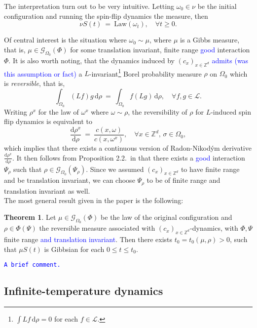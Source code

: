 \documentclass[12pt]{article}
\renewcommand{\d}{\mathrm{d}}
\newcommand{\G}{\mathcal{G}}
\newcommand{\Loc}{\mathcal{L}}
\newcommand{\Z}{\mathbb{Z}}
\newcommand{\Law}{\mathrm{Law}}
\newcommand{\1}{\mathbbm{1}}
\newcommand{\5}{\vspace{0.5cm}}
\theoremstyle{definition}
\newtheorem{thm}{Theorem}[section]
\begin{document}
The interpretation turn out to be very intuitive. Letting $\omega_0\in\nu$ be the initial configuration and running the spin-flip dynamics the measure, then
$$\nu S(t) ~=~ \Law(\omega_t), \quad \forall t\geq 0.$$ 

Of central interest is the situation where $\omega_0\sim\mu$, where $\mu$ is a Gibbs measure, that is, $\mu\in\G_{\Omega_0}(\Phi)$ for some translation invariant, finite range \textcolor{blue}{good} interaction $\Phi$. It is also worth noting, that the dynamics induced by $(c_x)_{x\in\Z^d}$ \textcolor{blue}{admits (was this assumption or fact)} a $L$-invariant\footnote{$\int Lf\,\d\rho=0$ for each $f\in\Loc$.} Borel probability measure $\rho$ on $\Omega_0$ which is \textit{reversible}, that is,
$$\int_{\Omega_0}(Lf)g\,\d\rho ~=~ \int_{\Omega_0}f(Lg)\,\d\rho, \quad \forall f,g\in\Loc.$$
Writing $\rho^x$ for the law of $\omega^x$ where $\omega\sim\rho$, the reversibility of $\rho$ for $L$-induced spin flip dynamics is equivalent to
$$\frac{\d\rho^x}{\d\rho} ~=~ \frac{c(x,\omega)}{c(x,\omega^x)}, \quad \forall x\in\Z^d,\,\sigma\in\Omega_0,$$
which implies that there exists a continuous version of Radon-Nikod\'ym derivative $\frac{\d\rho^x}{\d\rho}$. It then follows from Proposition 2.2.~in \cite{EFHR} that there exists a \textcolor{blue}{good} interaction $\Psi_\rho$ such that $\rho\in\G_{\Omega_0}(\Psi_\rho)$. Since we assumed $(c_{x})_{x\in\Z^d}$ to have finite range and be translation invariant, we can choose $\Psi_\rho$ to be of finite range and translation invariant as well.\\

The most general result given in the paper is the following:

\begin{thm}
Let $\mu\in\G_{\Omega_0}(\Phi)$ be the law of the original configuration and $\rho\in\Phi(\Psi)$ the reversible measure associated with $(c_x)_{x\in\Z^d}$-dynamics, with $\Phi,\Psi$ finite range \textcolor{blue}{and translation invariant}. Then there exists $t_0=t_0(\mu,\rho)>0$, such that $\mu S(t)$ is Gibbsian for each $0\leq t\leq t_0$. 
\end{thm}

\textcolor{blue}{\texttt{A brief comment.}}
 

\subsection{Infinite-temperature dynamics}
\end{document}
